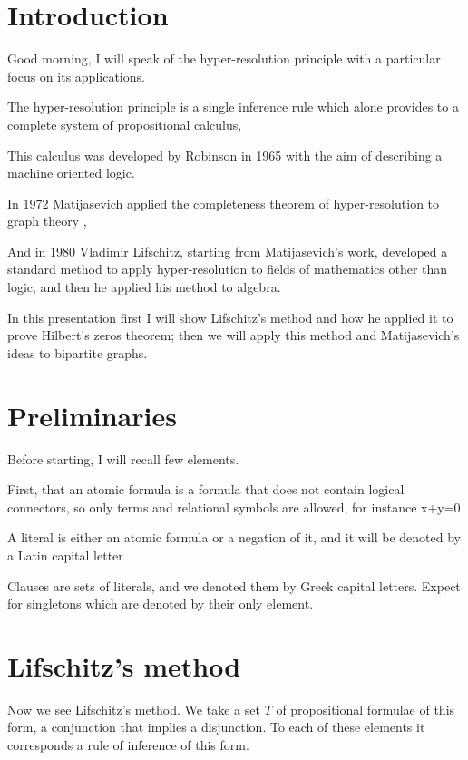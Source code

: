 \documentclass[12pt,a4paper,oneside]{article}
\author{Paolo Comensoli}
\begin{document}
\setcounter{section}{1}
\setlength{\oddsidemargin}{-0.3in}

\vspace*{-3cm}
\section{Introduction}
Good morning, I will speak of the hyper-resolution principle with a particular focus on its applications.

The hyper-resolution principle is a single inference rule which alone provides to a complete system of propositional calculus, 

This calculus was developed by Robinson in 1965 with the aim of describing a machine oriented logic. 

In 1972 Matijasevich applied the completeness theorem of hyper-resolution to graph theory ,

And in 1980 Vladimir Lifschitz, starting from Matijasevich's work, developed a standard method to apply hyper-resolution to fields of mathematics other than logic, and then he applied his method to algebra.

In this presentation first I will show Lifschitz's method and how he applied it to prove Hilbert's zeros theorem; then we will apply this method and Matijasevich's ideas to bipartite graphs.

\section{Preliminaries}
Before starting, I will recall few elements.

First, that an atomic formula is a formula that does not contain logical connectors, so only terms and relational symbols are allowed, for instance x+y=0 

A literal is either an atomic formula or a negation of it, and it will be denoted by a Latin capital letter

Clauses are sets of literals, and we denoted them by Greek capital letters. Expect for singletons which are denoted by their only element. 

\section{Lifschitz's method}
Now we see Lifschitz's method. We take a set $T$ of propositional formulae of this form, a conjunction that implies a disjunction. To each of these elements it corresponds a rule of inference of this form.
\end{document}
